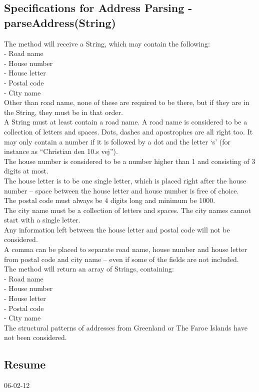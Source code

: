 \documentclass[a4paper,10pt,titlepage]{article}
\begin{document}
	\subsection{Specifications for Address Parsing - parseAddress(String)}
The method will receive a String, which may contain the following:\\
-	Road name\\
-	House number\\
-	House letter\\
-	Postal code\\
-	City name\\
Other than road name, none of these are required to be there, but if they are in the String, they must be in that order.\\
A String must at least contain a road name. A road name is considered to be a collection of letters and spaces. Dots, dashes and apostrophes are all right too. It may only contain a number if it is followed by a dot and the letter ‘s’ (for instance as “Christian den 10.s vej”).\\
The house number is considered to be a number higher than 1 and consisting of 3 digits at most.\\
The house letter is to be one single letter, which is placed right after the house number – space between the house letter and house number is free of choice.\\
The postal code must always be 4 digits long and minimum be 1000.\\
The city name must be a collection of letters and spaces. The city names cannot start with a single letter.\\
Any information left between the house letter and postal code will not be considered.\\
A comma can be placed to separate road name, house number and house letter from postal code and city name – even if some of the fields are not included.\\
The method will return an array of Strings, containing:\\
-	Road name\\
-	House number\\
-	House letter\\
-	Postal code\\
-	City name\\
The structural patterns of addresses from Greenland or The Faroe Islands have not been considered.\\


	\subsection{Resume}		
		\begin{center}
		06-02-12
		\end{center}
\end{document}
